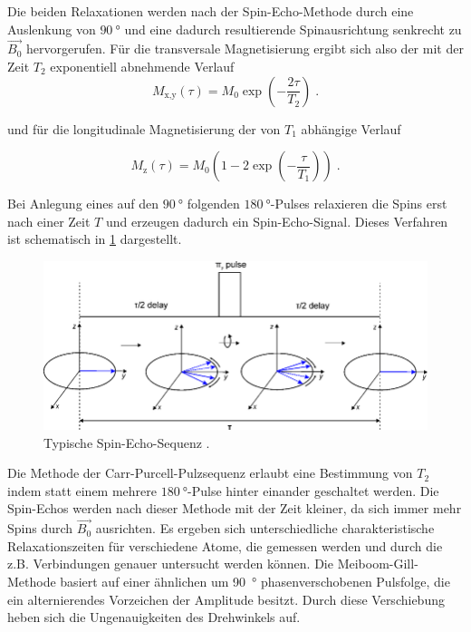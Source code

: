 Die beiden Relaxationen werden nach der Spin-Echo-Methode durch eine Auslenkung von $\SI{90}{\degree}$
und eine dadurch resultierende Spinausrichtung senkrecht zu $\vec{B_0}$ hervorgerufen.
Für die transversale Magnetisierung ergibt sich also der mit der Zeit $T_2$ exponentiell abnehmende Verlauf
\begin{equation}
    M_\text{x,y} \left(\tau\right) = M_0 \exp{\left(-\frac{2\tau}{T_2}\right)} \; .
    \label{eqn:MGM}
\end{equation}

und für die longitudinale Magnetisierung der von $T_1$ abhängige Verlauf 

\begin{equation}
    M_\text{z}\left(\tau\right) = M_0 \left(1-2\exp{\left(-\frac{\tau}{T_1}\right)}\right) \; .
    \label{eqn:SGR}
\end{equation}

Bei Anlegung eines auf den $\SI{90}{\degree}$ folgenden $\SI{180}{\degree}$-Pulses relaxieren die Spins erst nach einer Zeit $T$
und erzeugen dadurch ein Spin-Echo-Signal. Dieses Verfahren ist schematisch in \ref{fig:mgm1} dargestellt.

\begin{figure}
    \centering
    \includegraphics[scale=0.4]{content/spinecho.png}
    \caption{Typische Spin-Echo-Sequenz \cite{spinecho}.}
    \label{fig:mgm1}
  \end{figure}

  Die Methode der Carr-Purcell-Pulzsequenz erlaubt eine Bestimmung von $T_2$ indem statt einem mehrere
  $\SI{180}{\degree}$-Pulse hinter einander geschaltet werden. Die Spin-Echos werden nach dieser
  Methode mit der Zeit kleiner, da sich immer mehr Spins durch $\vec{B_0}$ ausrichten.
  Es ergeben sich unterschiedliche charakteristische Relaxationszeiten für verschiedene Atome, 
  die gemessen werden und durch die z.B. Verbindungen genauer untersucht werden können.
  Die Meiboom-Gill-Methode basiert auf einer ähnlichen um \SI{90}{\degree} phasenverschobenen Pulsfolge, 
  die ein alternierendes Vorzeichen der Amplitude besitzt. Durch diese Verschiebung heben sich die 
  Ungenauigkeiten des Drehwinkels auf.

